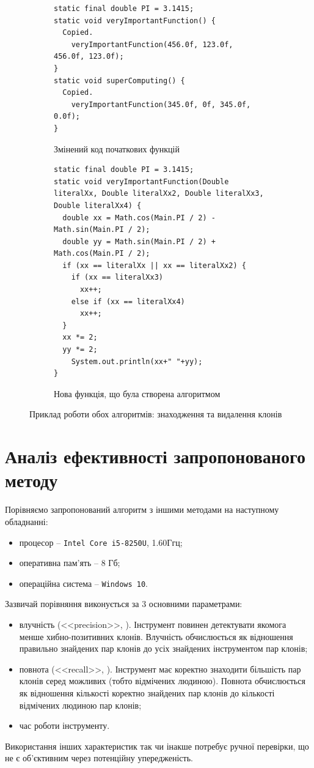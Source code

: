 \documentclass[a4paper, 14pt]{article}
\begin{document}
\begin{figure}[h!]
\centering
\begin{subfigure}[t]{0.4\textwidth}
\begin{lstlisting}[frame=none]
static final double PI = 3.1415;
static void veryImportantFunction() {
  Copied.
    veryImportantFunction(456.0f, 123.0f, 456.0f, 123.0f);
}
static void superComputing() {
  Copied.
    veryImportantFunction(345.0f, 0f, 345.0f, 0.0f);
}
\end{lstlisting}
\caption{Змінений код початкових функцій}
\end{subfigure}
\begin{subfigure}[t]{0.5\textwidth}
\begin{lstlisting}[frame=none]
static final double PI = 3.1415;
static void veryImportantFunction(Double literalXx, Double literalXx2, Double literalXx3, Double literalXx4) {
  double xx = Math.cos(Main.PI / 2) - Math.sin(Main.PI / 2);
  double yy = Math.sin(Main.PI / 2) + Math.cos(Main.PI / 2);
  if (xx == literalXx || xx == literalXx2) {
    if (xx == literalXx3)
      xx++;
    else if (xx == literalXx4)
      xx++;
  }
  xx *= 2;
  yy *= 2;
	System.out.println(xx+" "+yy);
}
\end{lstlisting}
\caption{Нова функція, що була створена алгоритмом}
\end{subfigure}
\caption{Приклад роботи обох алгоритмів: знаходження та видалення клонів}
\end{figure} 
\section{Аналіз ефективності запропонованого методу}
Порівняємо запропонований алгоритм з іншими методами на наступному обладнанні:
\begin{itemize}
\item процесор -- \verb|Intel Core i5-8250U|, 1.60Ггц;
\item оперативна пам'ять -- 8 Гб;
\item операційна система -- \verb|Windows 10|.
\end{itemize} 
Зазвичай порівняння виконується за 3 основними параметрами: 
\begin{itemize}
\item влучність (<<precision>>, \cite{wiki:precisionrecall}). Інструмент повинен детектувати якомога менше хибно-позитивних клонів. Влучність обчислюється як відношення правильно знайдених пар клонів до усіх знайдених інструментом пар клонів;
\item повнота (<<recall>>, \cite{wiki:precisionrecall}). Інструмент має коректно знаходити більшість пар клонів серед можливих (тобто відмічених людиною). Повнота обчислюється як відношення кількості коректно знайдених пар клонів до кількості відмічених людиною пар клонів;
\item час роботи інструменту.
\end{itemize}
Використання інших характеристик так чи інакше потребує ручної перевірки, що не є об'єктивним через потенційну упередженість.
\end{document}
